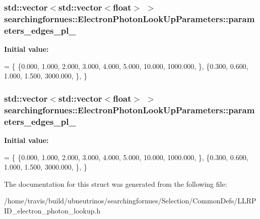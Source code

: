\subsubsection[{\texorpdfstring{parameters\+\_\+edges\+\_\+pl\+\_\+1}{parameters_edges_pl_1}}]{\setlength{\rightskip}{0pt plus 5cm}std\+::vector$<$std\+::vector$<$float$>$ $>$ searchingfornues\+::\+Electron\+Photon\+Look\+Up\+Parameters\+::parameters\+\_\+edges\+\_\+pl\+\_}\hypertarget{structsearchingfornues_1_1ElectronPhotonLookUpParameters_a450ea1e905833ffb52437b804c977184}{}\label{structsearchingfornues_1_1ElectronPhotonLookUpParameters_a450ea1e905833ffb52437b804c977184}
{\bfseries Initial value\+:}
\begin{DoxyCode}
= \{
    \{0.000, 1.000, 2.000, 3.000, 4.000, 5.000, 10.000, 1000.000, \},
    \{0.300, 0.600, 1.000, 1.500, 3000.000, \},
    \}
\end{DoxyCode}
\subsubsection[{\texorpdfstring{parameters\+\_\+edges\+\_\+pl\+\_\+2}{parameters_edges_pl_2}}]{\setlength{\rightskip}{0pt plus 5cm}std\+::vector$<$std\+::vector$<$float$>$ $>$ searchingfornues\+::\+Electron\+Photon\+Look\+Up\+Parameters\+::parameters\+\_\+edges\+\_\+pl\+\_}\hypertarget{structsearchingfornues_1_1ElectronPhotonLookUpParameters_a7ca42aa79e1b79629c3189b73b5cf8ad}{}\label{structsearchingfornues_1_1ElectronPhotonLookUpParameters_a7ca42aa79e1b79629c3189b73b5cf8ad}
{\bfseries Initial value\+:}
\begin{DoxyCode}
= \{
    \{0.000, 1.000, 2.000, 3.000, 4.000, 5.000, 10.000, 1000.000, \},
    \{0.300, 0.600, 1.000, 1.500, 3000.000, \},
    \}
\end{DoxyCode}


The documentation for this struct was generated from the following file\+:\begin{DoxyCompactItemize}
\item 
/home/travis/build/ubneutrinos/searchingfornues/\+Selection/\+Common\+Defs/L\+L\+R\+P\+I\+D\+\_\+electron\+\_\+photon\+\_\+lookup.\+h\end{DoxyCompactItemize}
